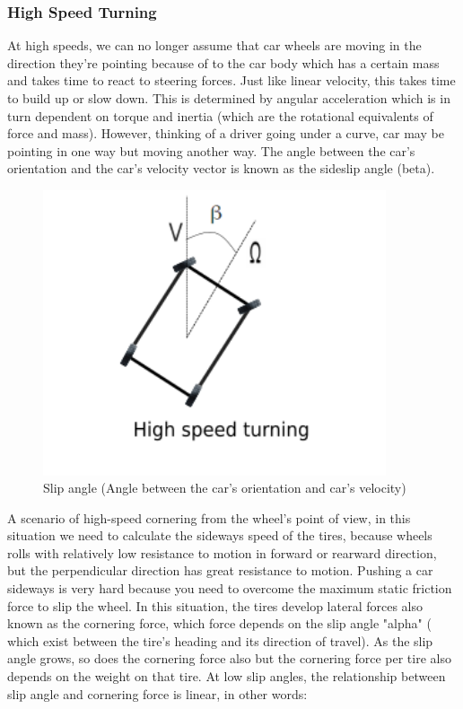 \documentclass{book}
\begin{document}
\subsubsection{High Speed Turning}
At high speeds, we can no longer assume that car wheels are moving in the direction they're pointing because of to the car body which has a certain mass and  takes time to react to steering forces. Just like linear velocity, this takes time to build up or slow down.  This is determined by angular acceleration which is in turn dependent on torque and inertia (which are the rotational equivalents of force and mass). However, thinking of a driver going under a curve, car may be pointing in one way but moving another way. The  angle between the car's orientation and the car's velocity vector is known as the sideslip angle (beta).\\
\begin{figure}[htbp]
  \centering
  \includegraphics[width=0.9\textwidth]{speedturning}
  \caption{Slip angle (Angle between the car's orientation and car's velocity)}
\end{figure}
A scenario of high-speed cornering from the wheel's point of view, in this situation we need to calculate the sideways speed of the tires, because wheels rolls with relatively low resistance to motion in forward or rearward direction, but the perpendicular direction has great resistance to motion. Pushing a car sideways is very hard because you need to overcome the maximum static friction force to slip the wheel. In this situation, the tires develop lateral forces also known as the cornering force, which force depends on the slip angle "alpha" ( which exist between the tire's heading and its direction of travel). As the slip angle grows, so does the cornering force also but the cornering force per tire also depends on the weight on that tire. At low slip angles, the relationship between slip angle and cornering force is linear, in other words:\\
\end{document}

